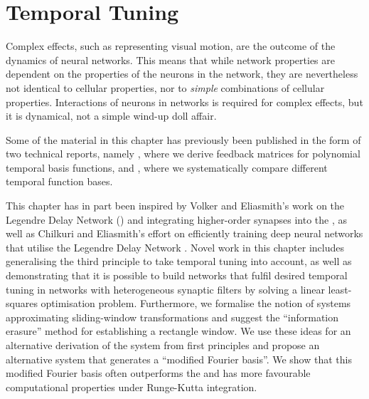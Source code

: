 \chapter{Temporal Tuning}
\label{chp:temporal_tuning}

\vspace{20pt}

\begin{OpeningQuote}
Complex effects, such as representing visual motion, are the outcome of the dynamics of neural networks. This means that while network properties are dependent on the properties of the neurons in the network, they are nevertheless not identical to cellular properties, nor to \emph{simple} combinations of cellular properties. Interactions of neurons in networks is required for complex effects, but it is dynamical, not a simple wind-up doll affair.
\end{OpeningQuote}

\begin{PriorPublication}
Some of the material in this chapter has previously been published in the form of two technical reports, namely \citet{stockel2021constructing}, where we derive feedback matrices for polynomial temporal basis functions, and \citet{stockel2021discrete}, where we systematically compare different temporal function bases.
\end{PriorPublication}

\begin{Contributions}
This chapter has in part been inspired by Volker and Eliasmith's work on the Legendre Delay Network (\LDN) and integrating higher-order synapses into the \NEF \citep{voelker2018improving,voelker2019}, as well as Chilkuri and Eliasmith's effort on efficiently training deep neural networks that utilise the Legendre Delay Network \citep{chilkuri2021parallelizing}.
Novel work in this chapter includes generalising the third \NEF principle to take temporal tuning into account, as well as demonstrating that it is possible to build networks that fulfil desired temporal tuning in networks with heterogeneous synaptic filters by solving a linear least-squares optimisation problem.
Furthermore, we formalise the notion of \LTI systems approximating sliding-window transformations and suggest the \enquote{information erasure} method for establishing a rectangle window.
We use these ideas for an alternative derivation of the \LDN \LTI system from first principles and propose an alternative \LTI system that generates a \enquote{modified Fourier basis}.
We show that this modified Fourier basis often outperforms the \LDN \LTI and has more favourable computational properties under Runge-Kutta integration.
\end{Contributions}

